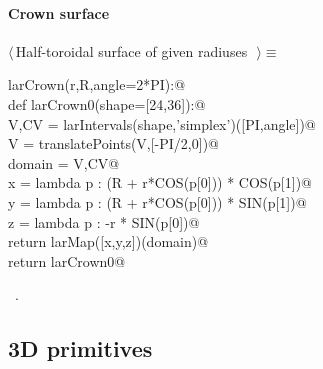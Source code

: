 \documentclass[11pt,oneside]{article}	%
\begin{document}
\paragraph{Crown surface}
\begin{flushleft} \small \label{scrap14}
$\langle\,$Half-toroidal surface of given radiuses\nobreak\ {\footnotesize {}}$\,\rangle\equiv$
\vspace{-1ex}
\begin{list}{}{} \item
\mbox{}\verb@def larCrown(r,R,angle=2*PI):@\\
\mbox{}\verb@   def larCrown0(shape=[24,36]):@\\
\mbox{}\verb@      V,CV = larIntervals(shape,'simplex')([PI,angle])@\\
\mbox{}\verb@      V = translatePoints(V,[-PI/2,0])@\\
\mbox{}\verb@      domain = V,CV@\\
\mbox{}\verb@      x = lambda p : (R + r*COS(p[0])) * COS(p[1])@\\
\mbox{}\verb@      y = lambda p : (R + r*COS(p[0])) * SIN(p[1])@\\
\mbox{}\verb@      z = lambda p : -r * SIN(p[0])@\\
\mbox{}\verb@      return larMap([x,y,z])(domain)@\\
\mbox{}\verb@   return larCrown0@\\
\mbox{}\verb@@{\NWsep}
\end{list}
\vspace{-1ex}
\footnotesize\addtolength{\baselineskip}{-1ex}
\begin{list}{}{\setlength{\itemsep}{-\parsep}\setlength{\itemindent}{-\leftmargin}}
\item \NWtxtMacroRefIn\ .
\end{list}
\end{flushleft}

\subsection{3D primitives}
\end{document}
